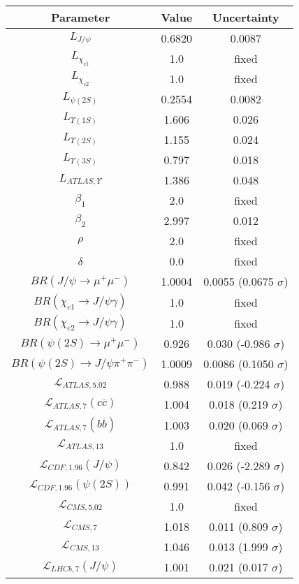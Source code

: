 \begin{table}[h!]
\centering
\begin{tabular}{c|c|c}
Parameter & Value & Uncertainty \\
\hline
$L_{J/\psi}$ & 0.6820 & 0.0087 \\
$L_{\chi_{c1}}$ & 1.0 & fixed \\
$L_{\chi_{c2}}$ & 1.0 & fixed \\
$L_{\psi(2S)}$ & 0.2554 & 0.0082 \\
$L_{\Upsilon(1S)}$ & 1.606 & 0.026 \\
$L_{\Upsilon(2S)}$ & 1.155 & 0.024 \\
$L_{\Upsilon(3S)}$ & 0.797 & 0.018 \\
$L_{ATLAS,\Upsilon}$ & 1.386 & 0.048 \\
$\beta_1$ & 2.0 & fixed \\
$\beta_2$ & 2.997 & 0.012 \\
$\rho$ & 2.0 & fixed \\
$\delta$ & 0.0 & fixed \\
$BR(J/\psi\rightarrow\mu^+\mu^-)$ & 1.0004 & 0.0055 (0.0675 $\sigma$) \\
$BR(\chi_{c1}\rightarrow J/\psi\gamma)$ & 1.0 & fixed \\
$BR(\chi_{c2}\rightarrow J/\psi\gamma)$ & 1.0 & fixed \\
$BR(\psi(2S)\rightarrow\mu^+\mu^-)$ & 0.926 & 0.030 (-0.986 $\sigma$) \\
$BR(\psi(2S)\rightarrow J/\psi\pi^+\pi^-)$ & 1.0009 & 0.0086 (0.1050 $\sigma$) \\
$\mathcal L_{ATLAS,5.02}$ & 0.988 & 0.019 (-0.224 $\sigma$) \\
$\mathcal L_{ATLAS,7}(c\overline c)$ & 1.004 & 0.018 (0.219 $\sigma$) \\
$\mathcal L_{ATLAS,7}(b\overline b)$ & 1.003 & 0.020 (0.069 $\sigma$) \\
$\mathcal L_{ATLAS,13}$ & 1.0 & fixed \\
$\mathcal L_{CDF,1.96}(J/\psi)$ & 0.842 & 0.026 (-2.289 $\sigma$) \\
$\mathcal L_{CDF,1.96}(\psi(2S))$ & 0.991 & 0.042 (-0.156 $\sigma$) \\
$\mathcal L_{CMS,5.02}$ & 1.0 & fixed \\
$\mathcal L_{CMS,7}$ & 1.018 & 0.011 (0.809 $\sigma$) \\
$\mathcal L_{CMS,13}$ & 1.046 & 0.013 (1.999 $\sigma$) \\
$\mathcal L_{LHCb,7}(J/\psi)$ & 1.001 & 0.021 (0.017 $\sigma$) \\

\end{tabular}
\end{table}
